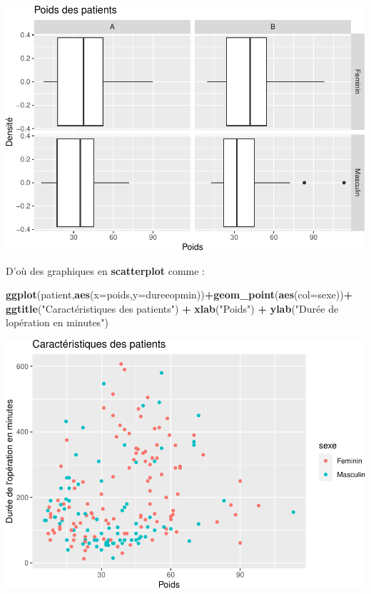 \documentclass[
]{book}
\newenvironment{Shaded}{\begin{snugshade}}{\end{snugshade}}
\newcommand{\AttributeTok}[1]{\textcolor[rgb]{0.13,0.29,0.53}{#1}}
\newcommand{\FunctionTok}[1]{\textcolor[rgb]{0.13,0.29,0.53}{\textbf{#1}}}
\newcommand{\NormalTok}[1]{#1}
\newcommand{\SpecialCharTok}[1]{\textcolor[rgb]{0.81,0.36,0.00}{\textbf{#1}}}
\newcommand{\StringTok}[1]{\textcolor[rgb]{0.31,0.60,0.02}{#1}}
\begin{document}
\includegraphics{_main_files/figure-latex/ggplot14-1.pdf}

D'où des graphiques en \textbf{scatterplot} comme :

\begin{Shaded}
\begin{Highlighting}[]
\FunctionTok{ggplot}\NormalTok{(patient,}\FunctionTok{aes}\NormalTok{(}\AttributeTok{x=}\NormalTok{poids,}\AttributeTok{y=}\NormalTok{dureeopmin))}\SpecialCharTok{+}\FunctionTok{geom\_point}\NormalTok{(}\FunctionTok{aes}\NormalTok{(}\AttributeTok{col=}\NormalTok{sexe))}\SpecialCharTok{+}
  \FunctionTok{ggtitle}\NormalTok{(}\StringTok{"Caractéristiques des patients"}\NormalTok{) }\SpecialCharTok{+} 
  \FunctionTok{xlab}\NormalTok{(}\StringTok{"Poids"}\NormalTok{) }\SpecialCharTok{+} 
  \FunctionTok{ylab}\NormalTok{(}\StringTok{"Durée de l\textquotesingle{}opération en minutes"}\NormalTok{) }
\end{Highlighting}
\end{Shaded}

\includegraphics{_main_files/figure-latex/ggplot15-1.pdf}
\end{document}
